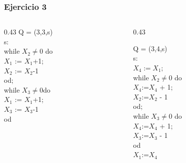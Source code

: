 \documentclass[xcolor=table]{beamer}
\begin{document}
\begin{frame} \frametitle{Ejercicio 3} \small  


\begin{columns}

\begin{column}{0.43\textwidth}
Q = (3,3,s) \\

s: \\

while $X_2 \neq 0 $ do \\
\hspace{0.3cm}$X_1$ := $X_1$+1; \\
\hspace{0.3cm}$X_2$ := $X_2$-1 \\
od; \\

while $X_3 \neq 0 $do\\ 
\hspace{0.3cm}$X_1$ := $X_1$+1; \\
\hspace{0.3cm}$X_3$ := $X_3$-1 \\
od\\

\end{column}

\begin{column}{0.43\textwidth}


    Q = (3,4,s)\\
    s:\\
    
    $X_4:=X_1;$\\
    while $X_2 \neq 0 $ do\\
    \hspace{0.3cm}$X_4$:=$X_4$ + 1;\\
    \hspace{0.3cm}$X_2$:=$X_2$ - 1\\
    od;\\
    
    while $X_3 \neq 0 $ do\\
    \hspace{0.3cm}$X_4$:=$X_4$ + 1;\\
    \hspace{0.3cm}$X_3$:=$X_3$ - 1\\
    od\\
    $X_1$:=$X_4$\\
\end{column}

\end{columns}

\end{frame} 
\end{document}
